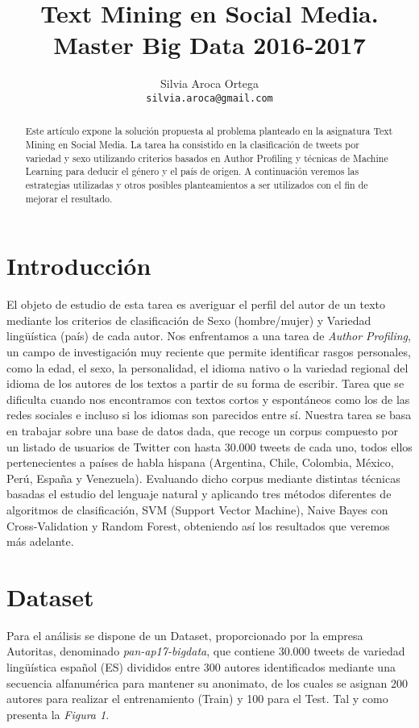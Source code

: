 \documentclass[11pt,a4paper]{article}
\title{Text Mining en Social Media. 
Master Big Data 2016-2017}
\author{Silvia Aroca Ortega \\
  {\tt silvia.aroca@gmail.com} \\}
\date{}
\begin{document}
\maketitle
\begin{abstract}

Este artículo expone la solución propuesta al problema planteado en la asignatura Text Mining en Social Media. 
La tarea ha consistido en la clasificación de tweets por variedad y sexo utilizando criterios basados en Author Profiling y técnicas de Machine Learning para deducir el género y el país de origen.
A continuación veremos las estrategias utilizadas y otros posibles planteamientos a ser utilizados con el fin de mejorar el resultado.

\end{abstract}


\section{Introducción}

El objeto de estudio de esta tarea es averiguar el perfil del autor de un texto mediante los criterios de clasificación de Sexo (hombre/mujer) y Variedad lingüística (país) de cada autor.
Nos enfrentamos a una tarea de {\em Author Profiling}, un campo de investigación muy reciente que permite identificar rasgos personales, como la edad, el sexo, la personalidad, el idioma nativo o la variedad regional del idioma de los autores de los textos a partir de su forma de escribir. Tarea que se dificulta cuando nos encontramos con textos cortos y espontáneos como los de las redes sociales e incluso si los idiomas son parecidos entre sí.
Nuestra tarea se basa en trabajar sobre una base de datos dada, que recoge un corpus compuesto por un listado de usuarios de Twitter con hasta 30.000 tweets de cada uno, todos ellos pertenecientes a países de habla hispana (Argentina, Chile, Colombia, México, Perú, España y Venezuela). Evaluando dicho corpus mediante distintas técnicas basadas el estudio del lenguaje natural y aplicando tres métodos diferentes de algoritmos de clasificación, SVM (Support Vector Machine), Naive Bayes con Cross-Validation y Random Forest, obteniendo así los resultados que veremos más adelante.


\section{Dataset}

Para el análisis se dispone de un Dataset, proporcionado por la empresa Autoritas, denominado {\em pan-ap17-bigdata}, que contiene 30.000 tweets de variedad lingüística español (ES) divididos entre 300 autores identificados mediante una secuencia alfanumérica para mantener su anonimato, de los cuales se asignan 200 autores para realizar el entrenamiento (Train) y 100 para el Test. Tal y como presenta la {\em Figura 1}.
\end{document}

